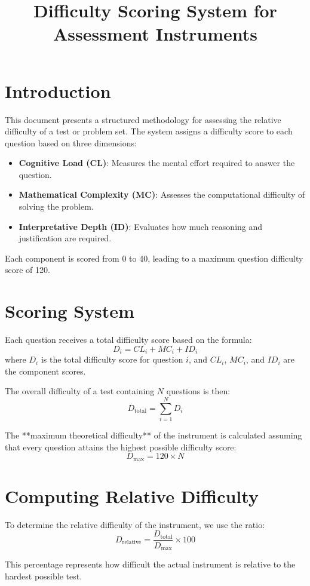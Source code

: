 \documentclass{article}
\title{Difficulty Scoring System for Assessment Instruments}
\author{}
\date{}
\begin{document}
\maketitle

\section{Introduction}
This document presents a structured methodology for assessing the relative difficulty of a test or problem set. The system assigns a difficulty score to each question based on three dimensions: 

\begin{itemize}
    \item \textbf{Cognitive Load (CL)}: Measures the mental effort required to answer the question.
    \item \textbf{Mathematical Complexity (MC)}: Assesses the computational difficulty of solving the problem.
    \item \textbf{Interpretative Depth (ID)}: Evaluates how much reasoning and justification are required.
\end{itemize}

Each component is scored from 0 to 40, leading to a maximum question difficulty score of 120.

\section{Scoring System}
Each question receives a total difficulty score based on the formula:
\[
D_i = CL_i + MC_i + ID_i
\]
where \(D_i\) is the total difficulty score for question \(i\), and \(CL_i\), \(MC_i\), and \(ID_i\) are the component scores.

The overall difficulty of a test containing \( N \) questions is then:
\[
D_{\text{total}} = \sum_{i=1}^{N} D_i
\]

The **maximum theoretical difficulty** of the instrument is calculated assuming that every question attains the highest possible difficulty score:
\[
D_{\text{max}} = 120 \times N
\]

\section{Computing Relative Difficulty}
To determine the relative difficulty of the instrument, we use the ratio:
\[
D_{\text{relative}} = \frac{D_{\text{total}}}{D_{\text{max}}} \times 100
\]

This percentage represents how difficult the actual instrument is relative to the hardest possible test.
\end{document}
